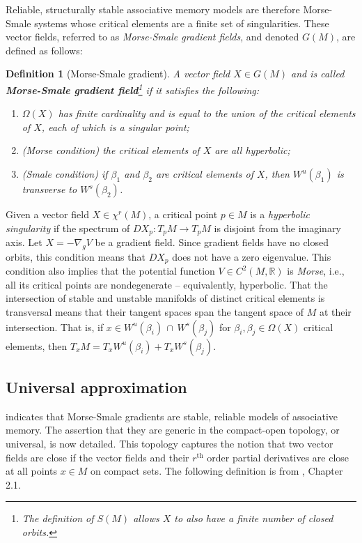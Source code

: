 \documentclass[12pt]{article}
\newtheorem{definition}[theorem]{Definition}
\begin{document}
Reliable, structurally stable associative memory models are therefore Morse-Smale systems whose critical elements are a finite set of singularities. These vector fields, referred to as \textit{Morse-Smale gradient fields}, and denoted $G(M)$, are defined as follows:

\begin{definition}[Morse-Smale gradient]
\label{definition:Morse-Smale-vector-field}
A vector field $X \in G(M)$ and is called \textbf{Morse-Smale gradient field}\footnote{The definition of $S(M)$ allows $X$ to also have a finite number of closed orbits.} if it satisfies the following:
    \begin{enumerate}[itemsep=0pt]
    \item $\Omega(X)$ has finite cardinality and is equal to the union of the critical elements of $X$, each of which is a singular point;
    \item (Morse condition) the critical elements of $X$ are all hyperbolic;
    \item (Smale condition) if $\beta_1$ and $\beta_2$ are critical elements of $X$, then $W^u(\beta_1)$ is transverse to $W^s(\beta_2)$.
\end{enumerate}
\end{definition}
\noindent

Given a vector field $X \in \chi^r(M)$, a critical point $p \in M$ is a \textit{hyperbolic singularity} if the spectrum of $DX_p: T_pM \rightarrow T_pM$ is disjoint from the imaginary axis. Let $X = -\nabla_g V$ be a gradient field. Since gradient fields have no closed orbits, this condition means that $DX_p$ does not have a zero eigenvalue. This condition also implies that the potential function $V \in C^2(M,\mathbb{R})$ is \textit{Morse}, i.e., all its critical points are nondegenerate -- equivalently, hyperbolic. That the intersection of stable and unstable manifolds of distinct critical elements is transversal means that their tangent spaces span the tangent space of $M$ at their intersection. That is, if $x \in W^u(\beta_i) \, \cap \,W^s(\beta_j)$ for $\beta_i, \beta_j \in \Omega(X)$ critical elements, then $T_xM = T_x W^u(\beta_i) + T_x W^s(\beta_j)$.



\subsection{Universal approximation}
\label{subsection:genericity-morse-smale-models-associative-memory}
 indicates that Morse-Smale gradients are stable, reliable models of associative memory. The assertion that they are generic in the compact-open topology, or universal, is now detailed. This topology captures the notion that two vector fields are close if the vector fields and their $r^{\text{th}}$ order partial derivatives are close at all points $x \in M$ on compact sets. The following definition is from \cite{hirsch2012differential}, Chapter 2.1.
\end{document}
